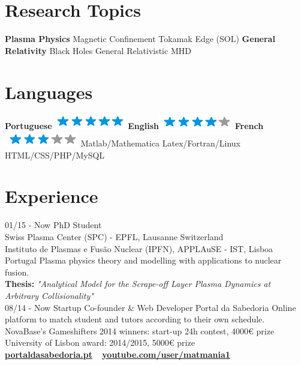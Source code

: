 \documentclass[]{friggeri-cv}
\begin{document}
\begin{aside}
  \section{Research Topics}
    \textbf{Plasma Physics}
    Magnetic Confinement
    Tokamak Edge (SOL)
    \textbf{General Relativity}
    Black Holes
    General Relativistic MHD
    ~
  \section{Languages}
    \textbf{Portuguese}\includegraphics[scale=0.40]{img/5stars.png}
    \textbf{English}\includegraphics[scale=0.40]{img/4stars.png}
    \textbf{French}\includegraphics[scale=0.40]{img/3stars.png}
    Matlab/Mathematica
    Latex/Fortran/Linux
    HTML/CSS/PHP/MySQL
\end{aside}

\section{Experience}
\begin{entrylist}
  \entry
    {01/15 - Now}
    {PhD Student}
    {\\
    Swiss Plasma Center (SPC) - EPFL, Lausanne Switzerland
    \\
    Instituto de Plasmas e Fusão Nuclear (IPFN), APPLAuSE - IST, Lisboa Portugal}
    {Plasma physics theory and modelling with applications to nuclear fusion.\\ \textbf{Thesis:} \emph{"Analytical Model for the Scrape-off Layer Plasma Dynamics at Arbitrary Collisionality"}\\}
  \entry
    {08/14 - Now}
    {Startup Co-founder \& Web Developer}
    {Portal da Sabedoria}
    {Online platform to match student and tutors according to their own schedule.
    \\
    NovaBase's Gameshifters 2014 winners: start-up 24h contest, 4000€ prize
    \\
    University of Lisbon award: 2014/2015, 5000€ prize
    \\
    \href{http://portaldasabedoria.pt}{\textbf{portaldasabedoria.pt}}
    ~
    \href{http://youtube.com/user/matmania1}{\textbf{youtube.com/user/matmania1}}\\}
\end{entrylist}
\end{document}
